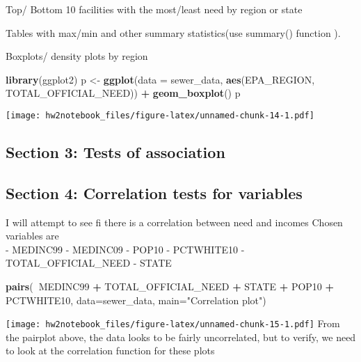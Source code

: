 \documentclass[]{article}
\newenvironment{Shaded}{\begin{snugshade}}{\end{snugshade}}
\newcommand{\KeywordTok}[1]{\textcolor[rgb]{0.13,0.29,0.53}{\textbf{#1}}}
\newcommand{\DataTypeTok}[1]{\textcolor[rgb]{0.13,0.29,0.53}{#1}}
\newcommand{\StringTok}[1]{\textcolor[rgb]{0.31,0.60,0.02}{#1}}
\newcommand{\OperatorTok}[1]{\textcolor[rgb]{0.81,0.36,0.00}{\textbf{#1}}}
\newcommand{\NormalTok}[1]{#1}
\begin{document}
Top/ Bottom 10 facilities with the most/least need by region or state

Tables with max/min and other summary statistics(use summary() function
).

Boxplots/ density plots by region

\begin{Shaded}
\begin{Highlighting}[]
\KeywordTok{library}\NormalTok{(ggplot2)}
\NormalTok{p <-}\StringTok{ }\KeywordTok{ggplot}\NormalTok{(}\DataTypeTok{data =}\NormalTok{ sewer_data, }\KeywordTok{aes}\NormalTok{(EPA_REGION, TOTAL_OFFICIAL_NEED)) }\OperatorTok{+}\StringTok{ }\KeywordTok{geom_boxplot}\NormalTok{()}
\NormalTok{p}
\end{Highlighting}
\end{Shaded}

\texttt{[image: hw2notebook\_files/figure-latex/unnamed-chunk-14-1.pdf]}

\subsection{Section 3: Tests of
association}\label{section-3-tests-of-association}

\subsection{Section 4: Correlation tests for
variables}\label{section-4-correlation-tests-for-variables}

I will attempt to see fi there is a correlation between need and incomes
Chosen variables are\\
- MEDINC99 - MEDINC09 - POP10 - PCTWHITE10 - TOTAL\_OFFICIAL\_NEED -
STATE

\begin{Shaded}
\begin{Highlighting}[]
\KeywordTok{pairs}\NormalTok{(}\OperatorTok{~}\NormalTok{MEDINC99 }\OperatorTok{+}\StringTok{ }\NormalTok{TOTAL_OFFICIAL_NEED }\OperatorTok{+}\StringTok{ }\NormalTok{STATE }\OperatorTok{+}\StringTok{ }\NormalTok{POP10 }\OperatorTok{+}\StringTok{ }\NormalTok{PCTWHITE10, }\DataTypeTok{data=}\NormalTok{sewer_data, }\DataTypeTok{main=}\StringTok{"Correlation plot"}\NormalTok{)}
\end{Highlighting}
\end{Shaded}

\texttt{[image: hw2notebook\_files/figure-latex/unnamed-chunk-15-1.pdf]}
From the pairplot above, the data looks to be fairly uncorrelated, but
to verify, we need to look at the correlation function for these plots
\end{document}

